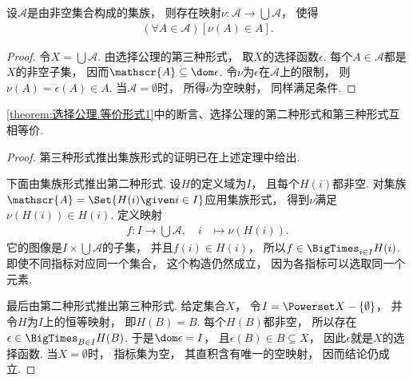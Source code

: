 \begin{theorem}\label{theorem:选择公理.等价形式1}
    设\(\mathscr{A}\)是由非空集合构成的集族，
    则存在映射\(\nu\colon\mathscr{A}\to\bigcup\mathscr{A}\)，
    使得
    \begin{align*}
        (\forall A\in\mathscr{A})[\nu(A)\in A].
    \end{align*}
    \begin{proof}
        令\(X=\bigcup\mathscr{A}\).
        由选择公理的第三种形式，
        取\(X\)的选择函数\(\epsilon\).
        每个\(A\in\mathscr{A}\)都是\(X\)的非空子集，
        因而\(\mathscr{A}\subseteq\dom\epsilon\).
        令\(\nu\)为\(\epsilon\)在\(\mathscr{A}\)上的限制，
        则\(\nu(A)=\epsilon(A)\in A\).
        当\(\mathscr{A}=\emptyset\)时，
        所得\(\nu\)为空映射，
        同样满足条件.
    \end{proof}
\end{theorem}

\begin{proposition}
    \cref{theorem:选择公理.等价形式1}中的断言、选择公理的第二种形式和第三种形式互相等价.
    \begin{proof}
        第三种形式推出集族形式的证明已在上述定理中给出.

        下面由集族形式推出第二种形式.
        设\(H\)的定义域为\(I\)，
        且每个\(H(i)\)都非空.
        对集族\(\mathscr{A}=\Set{H(i)\given i\in I}\)应用集族形式，
        得到\(\nu\)满足\(\nu(H(i))\in H(i)\).
        定义映射
        \begin{align*}
            f\colon I\to\bigcup\mathscr{A},\quad
            i&\mapsto\nu(H(i)).
        \end{align*}
        它的图像是\(I\times\bigcup\mathscr{A}\)的子集，
        并且\(f(i)\in H(i)\)，
        所以\(f\in\BigTimes_{i\in I}H(i)\).
        即使不同指标对应同一个集合，
        这个构造仍然成立，
        因为各指标可以选取同一个元素.

        最后由第二种形式推出第三种形式.
        给定集合\(X\)，
        令\(I=\Powerset X-\{\emptyset\}\)，
        并令\(H\)为\(I\)上的恒等映射，
        即\(H(B)=B\).
        每个\(H(B)\)都非空，
        所以存在\(\epsilon\in\BigTimes_{B\in I}H(B)\).
        于是\(\dom\epsilon=I\)，
        且\(\epsilon(B)\in B\subseteq X\)，
        因此\(\epsilon\)就是\(X\)的选择函数.
        当\(X=\emptyset\)时，
        指标集为空，
        其直积含有唯一的空映射，
        因而结论仍成立.
    \end{proof}
\end{proposition}

